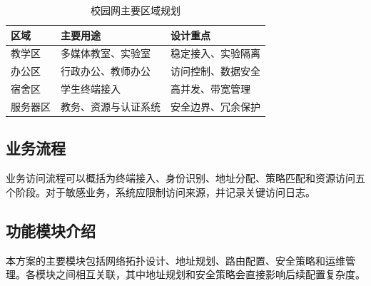 \begin{table}[htbp]
  \centering
  \caption{校园网主要区域规划}
  \label{tab:area-plan}
  \begin{tabular}{lll}
    \toprule
    区域 & 主要用途 & 设计重点 \\
    \midrule
    教学区 & 多媒体教室、实验室 & 稳定接入、实验隔离 \\
    办公区 & 行政办公、教师办公 & 访问控制、数据安全 \\
    宿舍区 & 学生终端接入 & 高并发、带宽管理 \\
    服务器区 & 教务、资源与认证系统 & 安全边界、冗余保护 \\
    \bottomrule
  \end{tabular}
\end{table}

\subsection{业务流程}

业务访问流程可以概括为终端接入、身份识别、地址分配、策略匹配和资源访问五个阶段。对于敏感业务，系统应限制访问来源，并记录关键访问日志。

\subsection{功能模块介绍}

本方案的主要模块包括网络拓扑设计、地址规划、路由配置、安全策略和运维管理。各模块之间相互关联，其中地址规划和安全策略会直接影响后续配置复杂度。

